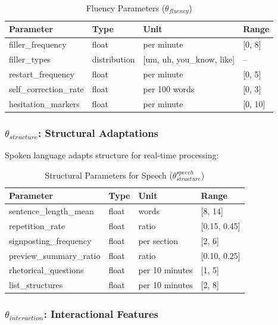 \begin{table}[h]
\centering
\caption{Fluency Parameters ($\theta_{fluency}$)}
\label{tab:sw-fluency}
\begin{tabular}{llll}
\toprule
\textbf{Parameter} & \textbf{Type} & \textbf{Unit} & \textbf{Range} \\
\midrule
filler\_frequency & float & per minute & [0, 8] \\
filler\_types & distribution & [um, uh, you\_know, like] & -- \\
restart\_frequency & float & per minute & [0, 5] \\
self\_correction\_rate & float & per 100 words & [0, 3] \\
hesitation\_markers & float & per minute & [0, 10] \\
\bottomrule
\end{tabular}
\end{table}

\subsubsection{$\theta_{structure}$: Structural Adaptations}

Spoken language adapts structure for real-time processing:

\begin{table}[h]
\centering
\caption{Structural Parameters for Speech ($\theta_{structure}^{speech}$)}
\label{tab:sw-speech-structure}
\begin{tabular}{llll}
\toprule
\textbf{Parameter} & \textbf{Type} & \textbf{Unit} & \textbf{Range} \\
\midrule
sentence\_length\_mean & float & words & [8, 14] \\
repetition\_rate & float & ratio & [0.15, 0.45] \\
signposting\_frequency & float & per section & [2, 6] \\
preview\_summary\_ratio & float & ratio & [0.10, 0.25] \\
rhetorical\_questions & float & per 10 minutes & [1, 5] \\
list\_structures & float & per 10 minutes & [2, 8] \\
\bottomrule
\end{tabular}
\end{table}

\subsubsection{$\theta_{interaction}$: Interactional Features}

